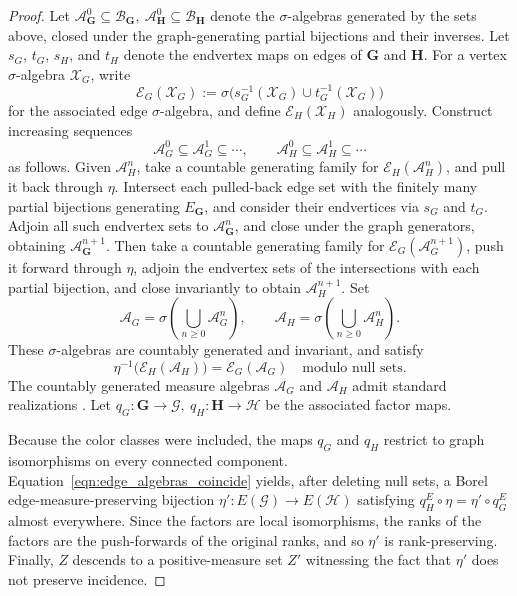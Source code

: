 \documentclass{article}
\theoremstyle{plain}
\theoremstyle{definition}
\newcommand{\cG}{\mathcal{G}}
\newcommand{\cH}{\mathcal{H}}
\begin{document}
\begin{proof}
Let $ \mathcal A_{\mathbf G}^0\subseteq\mathcal B_{\mathbf G}, \ \mathcal A_{\mathbf H}^0\subseteq\mathcal B_{\mathbf H}$ denote the $\sigma$-algebras generated by the sets above, closed under the graph-generating partial bijections and their inverses. Let $s_{G}$, $t_{G}$, $s_H$, and $t_H$ denote the endvertex maps on edges of $\mathbf{G}$ and $\mathbf{H}$. For a vertex $\sigma$-algebra \(\mathcal X_G\), write \[ \mathcal E_G(\mathcal X_G) := \sigma\bigl( s_G^{-1}(\mathcal X_G) \cup t_G^{-1}(\mathcal X_G) \bigr) \] for the associated edge $\sigma$-algebra, and define \(\mathcal E_H(\mathcal X_H)\) analogously. Construct increasing sequences \[ \mathcal A_G^0\subseteq\mathcal A_G^1\subseteq\cdots, \qquad \mathcal A_H^0\subseteq\mathcal A_H^1\subseteq\cdots \] as follows. Given \(\mathcal A_H^n\), take a countable generating family for $\mathcal E_H(\mathcal A_H^n)$, and pull it back through \(\eta\). Intersect each pulled-back edge set with the finitely many partial bijections generating $E_{\mathbf G}$, and consider their endvertices via $s_{G}$ and $t_G$. Adjoin all such endvertex sets to \(\mathcal A_{\mathbf G}^n\), and close under the graph generators, obtaining \(\mathcal A_{\mathbf G}^{n+1}\). Then take a countable generating family for $ \mathcal E_G(\mathcal A_G^{n+1})$, push it forward through \(\eta\), adjoin the endvertex sets of the intersections with each partial bijection, and close invariantly to obtain \(\mathcal A_H^{n+1}\). Set \[ \mathcal A_G = \sigma\left(\bigcup_{n\geq0}\mathcal A_G^n\right), \qquad \mathcal A_H = \sigma\left(\bigcup_{n\geq0}\mathcal A_H^n\right). \] These $\sigma$-algebras are countably generated and invariant, and satisfy 
\begin{equation}  \label{eqn:edge_algebras_coincide}  
\eta^{-1}\bigl(\mathcal E_H(\mathcal A_H)\bigr) = \mathcal E_G(\mathcal A_G) \quad \textrm{modulo null sets.} 
\end{equation}
The countably generated measure algebras \(\mathcal A_G\) and \(\mathcal A_H\) admit standard  realizations \cite{conley2013ultraproducts, carderi2015ultraproducts}. Let $q_G:\mathbf G \to \cG, \ q_H:\mathbf H\to \cH$ be the associated factor maps. 

Because the color classes were included, the maps \(q_G\) and \(q_H\) restrict to graph isomorphisms on every connected component.  Equation~\eqref{eqn:edge_algebras_coincide} yields, after deleting null sets, a Borel edge-measure-preserving bijection $ \eta':E(\cG)\longrightarrow E(\cH)$ satisfying $ q_H^E\circ\eta = \eta'\circ q_G^E$ almost everywhere. Since the factors are local isomorphisms, the ranks of the factors are the push-forwards of the original ranks, and so \(\eta'\) is rank-preserving. Finally, \(Z\) descends to a positive-measure set \(Z'\) witnessing the fact that $\eta'$ does not preserve incidence.
\end{proof}
\end{document}
